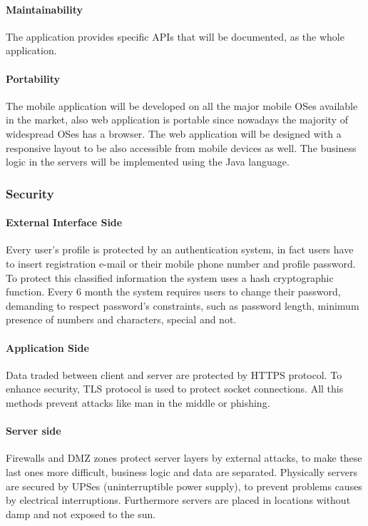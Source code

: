 \documentclass[a4paper,12pt,dvipsnames]{article}%
\begin{document}
\paragraph{Maintainability} The application provides specific APIs that will be documented, as the whole application.
\paragraph{Portability} The mobile application will be developed on all the major mobile OSes available in the market, also web application is portable since nowadays the majority of widespread OSes has a browser. The web application will be designed with a responsive layout to be also accessible from mobile devices as well. The business logic in the servers will be implemented using the Java language.
\subsubsection{Security}
\paragraph{External Interface Side}
Every user's profile is protected by an authentication system, in fact users have to insert registration e-mail or their mobile phone number and profile password. To protect this classified information the system uses a hash cryptographic function. Every 6 month the system requires users to change their password, demanding to respect password's constraints, such as password length, minimum presence of numbers and characters, special and not.
\paragraph{Application Side}
Data traded between client and server are protected by HTTPS protocol. To enhance security, TLS protocol is used to protect socket connections. All this methods prevent attacks like man in the middle or phishing.
\paragraph{Server side}
Firewalls and DMZ zones protect server layers by external attacks, to make these last ones more difficult, business logic and data are separated. Physically servers are secured by UPSes (uninterruptible power supply), to prevent problems causes by electrical interruptions. Furthermore servers are placed in locations without damp and not exposed to the sun.
\newpage
\end{document}

